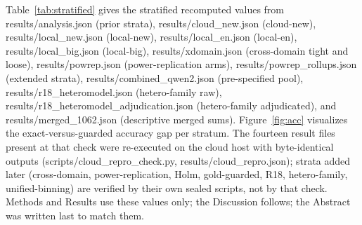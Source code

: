 \documentclass[10pt]{article} %
\begin{document}
Table~\ref{tab:stratified} gives the stratified recomputed values from results/analysis.json (prior strata), results/cloud\_new.json (cloud-new), results/local\_new.json (local-new), results/local\_en.json (local-en), results/local\_big.json (local-big), results/xdomain.json (cross-domain tight and loose), results/powrep.json (power-replication arms), results/powrep\_rollups.json (extended strata), results/combined\_qwen2.json (pre-specified pool), results/r18\_heteromodel.json (hetero-family raw), results/r18\_heteromodel\_adjudication.json (hetero-family adjudicated), and results/merged\_1062.json (descriptive merged sums). Figure~\ref{fig:acc} visualizes the exact-versus-guarded accuracy gap per stratum. The fourteen result files present at that check were re-executed on the cloud host with byte-identical outputs (scripts/cloud\_repro\_check.py, results/cloud\_repro.json); strata added later (cross-domain, power-replication, Holm, gold-guarded, R18, hetero-family, unified-binning) are verified by their own sealed scripts, not by that check. Methods and Results use these values only; the Discussion follows; the Abstract was written last to match them.
\end{document}
